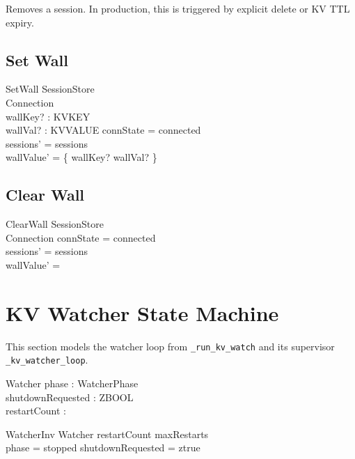 \documentclass[a4paper,10pt,fleqn]{article}
\begin{document}
Removes a session.  In production, this is triggered by
explicit delete or KV TTL expiry.

\subsection{Set Wall}

\begin{schema}{SetWall}
  \Delta SessionStore \\
  \Xi Connection \\
  wallKey? : KVKEY \\
  wallVal? : KVVALUE
  \where
  connState = connected \\
  sessions' = sessions \\
  wallValue' = \{ wallKey? \mapsto wallVal? \}
\end{schema}

\subsection{Clear Wall}

\begin{schema}{ClearWall}
  \Delta SessionStore \\
  \Xi Connection
  \where
  connState = connected \\
  sessions' = sessions \\
  wallValue' = \emptyset
\end{schema}

\section{KV Watcher State Machine}

This section models the watcher loop from \texttt{\_run\_kv\_watch}
and its supervisor \texttt{\_kv\_watcher\_loop}.

\begin{schema}{Watcher}
  phase : WatcherPhase \\
  shutdownRequested : ZBOOL \\
  restartCount : \nat
\end{schema}

\begin{schema}{WatcherInv}
  Watcher
  \where
  restartCount \leq maxRestarts \\
  phase = stopped \implies shutdownRequested = ztrue
\end{schema}
\end{document}

